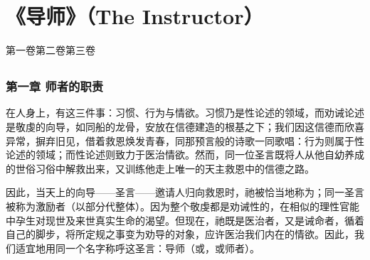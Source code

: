 
\chapter{《导师》（The Instructor）}


第一卷\newline{}第二卷\newline{}第三卷\par



\section{}

\par


\subsection{第一章 师者的职责}

在人身上，有这三件事：习惯、行为与情欲。习惯乃是性论述的领域，而劝诫论述是敬虔的向导，如同船的龙骨，安放在信德建造的根基之下；我们因这信德而欣喜异常，摒弃旧见，借着救恩焕发青春，同那预言般的诗歌一同歌唱：行为则属于性论述的领域；而性论述则致力于医治情欲。然而，同一位圣言既将人从他自幼养成的世俗习俗中解救出来，又训练他走上唯一的天主救恩中的信德之路。\par

因此，当天上的向导——圣言——邀请人归向救恩时，祂被恰当地称为；同一圣言被称为激励者（以部分代整体）。因为整个敬虔都是劝诫性的，在相似的理性官能中孕生对现世及来世真实生命的渴望。但现在，祂既是医治者，又是诫命者，循着自己的脚步，将所定规之事变为劝导的对象，应许医治我们内在的情欲。因此，我们适宜地用同一个名字称呼这圣言：导师（或，或师者）。\par

